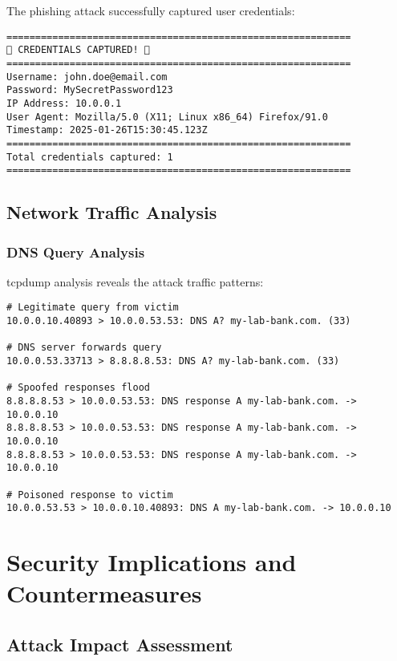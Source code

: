 \documentclass[12pt,a4paper]{article}
\begin{document}
The phishing attack successfully captured user credentials:

\begin{lstlisting}[caption=Credential Capture Log]
============================================================
🎯 CREDENTIALS CAPTURED! 🎯
============================================================
Username: john.doe@email.com
Password: MySecretPassword123
IP Address: 10.0.0.1
User Agent: Mozilla/5.0 (X11; Linux x86_64) Firefox/91.0
Timestamp: 2025-01-26T15:30:45.123Z
============================================================
Total credentials captured: 1
============================================================
\end{lstlisting}

\subsection{Network Traffic Analysis}

\subsubsection{DNS Query Analysis}

tcpdump analysis reveals the attack traffic patterns:

\begin{lstlisting}[caption=DNS Traffic Analysis]
# Legitimate query from victim
10.0.0.10.40893 > 10.0.0.53.53: DNS A? my-lab-bank.com. (33)

# DNS server forwards query
10.0.0.53.33713 > 8.8.8.8.53: DNS A? my-lab-bank.com. (33)

# Spoofed responses flood
8.8.8.8.53 > 10.0.0.53.53: DNS response A my-lab-bank.com. -> 10.0.0.10
8.8.8.8.53 > 10.0.0.53.53: DNS response A my-lab-bank.com. -> 10.0.0.10
8.8.8.8.53 > 10.0.0.53.53: DNS response A my-lab-bank.com. -> 10.0.0.10

# Poisoned response to victim
10.0.0.53.53 > 10.0.0.10.40893: DNS A my-lab-bank.com. -> 10.0.0.10
\end{lstlisting}

\section{Security Implications and Countermeasures}

\subsection{Attack Impact Assessment}
\end{document}
